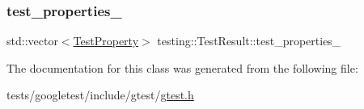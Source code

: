 \mbox{\label{classtesting_1_1TestResult_a29cde491988faff4ef2d9f9b6c13d9fa}} 
\subsubsection{\texorpdfstring{test\+\_\+properties\+\_\+}{test\_properties\_}}
{\footnotesize\ttfamily std\+::vector$<$\hyperlink{classtesting_1_1TestProperty}{Test\+Property}$>$ testing\+::\+Test\+Result\+::test\+\_\+properties\+\_\+\hspace{0.3cm}{\ttfamily [private]}}



The documentation for this class was generated from the following file\+:\begin{DoxyCompactItemize}
\item 
tests/googletest/include/gtest/\hyperlink{gtest_8h}{gtest.\+h}\end{DoxyCompactItemize}

